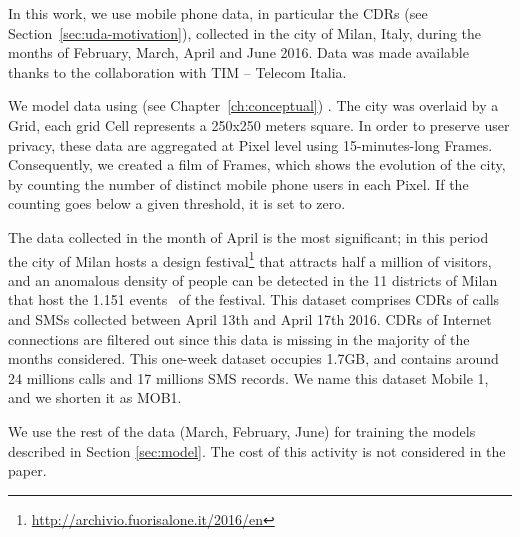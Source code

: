 {%

In this work, we use mobile phone data, in particular the CDRs (see Section~\ref{sec:uda-motivation}), collected in the city of Milan, Italy, during the months of February, March, April and June 2016. Data was made available thanks to the collaboration with TIM -- Telecom Italia.

We model data using \frappe{} (see Chapter~\ref{ch:conceptual}) .
The city was overlaid by a \textsf{Grid}, each grid \textsf{Cell} represents a 250x250 meters square. 
In order to preserve user privacy, these data are aggregated at \textsf{Pixel} level using 15-minutes-long \textsf{Frame}s.
Consequently, we created a film of \textsf{Frame}s, which shows the evolution of the city, by counting the number of distinct mobile phone users in each \textsf{Pixel}. If the counting goes below a given threshold, it is set to zero.

The data collected in the month of April is the most significant; in this period the city of Milan hosts a design festival\footnote{\url{http://archivio.fuorisalone.it/2016/en}} that attracts half a million of visitors, and an anomalous density of people can be detected in the 11 districts of Milan that host the 1.151 events~\cite{DBLP:journals/ieeemm/BalduiniVALAC15} of the festival. This dataset comprises CDRs of calls and SMSs collected between April 13th and April 17th 2016. CDRs of Internet connections are filtered out since this data is missing in the majority of the months considered. This one-week dataset occupies 1.7GB, and contains around 24 millions calls and 17 millions SMS records. We name this dataset Mobile 1, and we shorten it as MOB1. 

We use the rest of the data (March, February, June) for training the models described in Section \ref{sec:model}. The cost of this activity is not considered in the paper.

}
